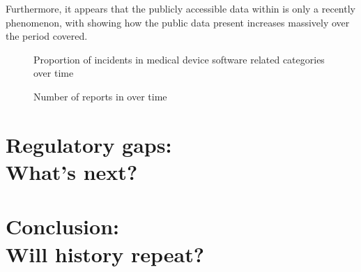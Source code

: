\documentclass{cshonours}
\begin{document}
Furthermore, it appears that the publicly accessible data within \maude is only a recently phenomenon, with  showing how the public data present increases massively over the period covered.

\begin{figure}
  
  \caption{Proportion of incidents in medical device software related categories over time}
  \label{fig:proportiongraph}
\end{figure}

\begin{figure}
  
  \caption{Number of reports in \maude over time}
  \label{fig:totalgraph}
\end{figure}


\chapter{Regulatory gaps:\\What's next?}
\label{chap:reggaps}


\chapter{Conclusion:\\Will history repeat?}
\label{chap:conclusion}


\appendix


\end{document}

